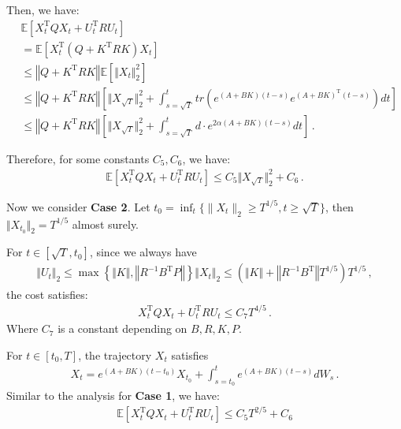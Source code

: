\documentclass{article}
\theoremstyle{definition}
\begin{document}
Then, we have:
\begin{align*}
&\mathbb{E}\left[X^{\mathrm{T}}_{t}QX_{t}+U^{\mathrm{T}}_{t}RU_{t}\right]\\&=\mathbb{E}\left[X^{\mathrm{T}}_{t}(Q+K^{\mathrm{T}}RK)X_{t}\right]\\
&\leq \left\Vert Q+K^{\mathrm{T}}RK\right\Vert \mathbb{E}\left[\Vert X_{t}\Vert^{2}_{2}\right]\\
&\leq \left\Vert Q+K^{\mathrm{T}}RK\right\Vert\left[\Vert X_{\sqrt{T}}\Vert^{2}_{2}+\int_{s=\sqrt{T}}^{t}tr\left(e^{(A+BK)(t-s)}e^{(A+BK)^{\mathrm{T}}(t-s)}\right)dt \right]\\
&\leq \left\Vert Q+K^{\mathrm{T}}RK\right\Vert\left[\Vert X_{\sqrt{T}}\Vert^{2}_{2}+\int_{s=\sqrt{T}}^{t}d\cdot e^{2\alpha(A+BK)(t-s)}dt \right]\,.
\end{align*}

Therefore, for some constants $C_{5}, C_{6}$, we have:
\begin{align*}
\mathbb{E}\left[X^{\mathrm{T}}_{t}QX_{t}+U^{\mathrm{T}}_{t}RU_{t}\right]\leq C_{5}\Vert X_{\sqrt{T}}\Vert^{2}_{2}+C_{6}\,.
\end{align*}

Now we consider \textbf{Case 2}. Let $t_{0}=\inf_{t}\{\|X_{t}\|_{2}\geq T^{1/5}, t\geq \sqrt{T}\}$, then $\Vert X_{t_{0}}\Vert_{2}=T^{1/5}$ almost surely. 

For $t\in[\sqrt{T},t_{0}]$, since we always have
\begin{align*}
\Vert U_{t}\Vert_{2} \leq \max\left\{\Vert K\Vert, \left\Vert R^{-1}B^{\mathrm{T}}P\right\Vert\right\}\Vert X_{t}\Vert_{2}\leq \left(\Vert K\Vert+\left\Vert R^{-1}B^{\mathrm{T}}\right\Vert T^{1/5}\right)T^{1/5}\,,   
\end{align*}
the cost satisfies:
\begin{align*}
X^{\mathrm{T}}_{t}QX_{t}+U^{\mathrm{T}}_{t}RU_{t}\leq C_{7}T^{4/5}\,.
\end{align*}
Where $C_{7}$ is a constant depending on $B,R,K,P$.

For $t\in[t_{0},T]$, the trajectory $X_{t}$ satisfies
\begin{align*}
    X_{t}=e^{(A+BK)(t-t_{0})}X_{t_{0}}+\int_{s=t_{0}}^{t}e^{(A+BK)(t-s)}dW_{s}\,.
\end{align*}
Similar to the analysis for \textbf{Case 1}, we have:
\begin{align*}
\mathbb{E}\left[X^{\mathrm{T}}_{t}QX_{t}+U^{\mathrm{T}}_{t}RU_{t}\right]\leq C_{5}T^{2/5}+C_{6}
\end{align*}
\end{document}
